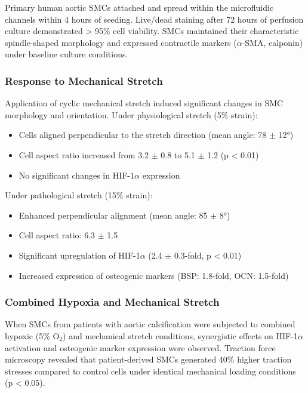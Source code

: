 \documentclass[materials,article,submit,moreauthors,pdftex]{Definitions/mdpi}
\begin{document}
Primary human aortic SMCs attached and spread within the microfluidic channels within 4 hours of seeding. Live/dead staining after 72 hours of perfusion culture demonstrated > 95\% cell viability. SMCs maintained their characteristic spindle-shaped morphology and expressed contractile markers ($\alpha$-SMA, calponin) under baseline culture conditions.

\subsubsection{Response to Mechanical Stretch}

Application of cyclic mechanical stretch induced significant changes in SMC morphology and orientation. Under physiological stretch (5\% strain):

\begin{itemize}
    \item Cells aligned perpendicular to the stretch direction (mean angle: 78 $\pm$ 12°)
    \item Cell aspect ratio increased from 3.2 $\pm$ 0.8 to 5.1 $\pm$ 1.2 (p < 0.01)
    \item No significant changes in HIF-1$\alpha$ expression
\end{itemize}

Under pathological stretch (15\% strain):

\begin{itemize}
    \item Enhanced perpendicular alignment (mean angle: 85 $\pm$ 8°)
    \item Cell aspect ratio: 6.3 $\pm$ 1.5
    \item Significant upregulation of HIF-1$\alpha$ (2.4 $\pm$ 0.3-fold, p < 0.01)
    \item Increased expression of osteogenic markers (BSP: 1.8-fold, OCN: 1.5-fold)
\end{itemize}

\subsubsection{Combined Hypoxia and Mechanical Stretch}

When SMCs from patients with aortic calcification were subjected to combined hypoxic (5\% O$_2$) and mechanical stretch conditions, synergistic effects on HIF-1$\alpha$ activation and osteogenic marker expression were observed. Traction force microscopy revealed that patient-derived SMCs generated 40\% higher traction stresses compared to control cells under identical mechanical loading conditions (p < 0.05).
\end{document}
